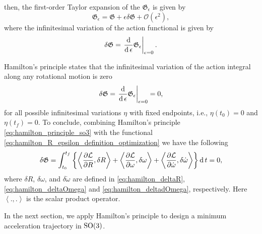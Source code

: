 then, the first-order Taylor expansion of the $\mathfrak{G}_\epsilon$ is given by
\begin{equation}
      \mathfrak{G}_\epsilon = \mathfrak{G} + \epsilon \delta \mathfrak{G} + \mathcal{O}\left(\epsilon^2\right),
\end{equation}
where the infinitesimal variation of the action functional is given by 
\begin{equation}
    \delta \mathfrak{G}  = \left.\frac{\operatorname{d}}{\operatorname{d} \epsilon} \mathfrak{G}_\epsilon\right|_{\epsilon = 0}.
\end{equation}
\par
Hamilton's principle states that the infinitesimal variation of the action integral along any rotational motion is zero
\begin{equation}
    \label{eq:hamilton_principle_so3}
    \delta \mathfrak{G}  = \left.\frac{\operatorname{d}}{\operatorname{d} \epsilon} \mathfrak{G}_\epsilon\right|_{\epsilon = 0} = 0,
\end{equation}
for all possible infinitesimal variations $\eta$ with fixed endpoints, i.e., $\eta(t_0) = 0$ and $\eta(t_f) = 0$.
To conclude, combining Hamilton's principle \eqref{eq:hamilton_principle_so3} with the functional \eqref{eq:hamilton_R_epsilon_definition_optimization} we have the following 
\begin{equation}
    \label{eq:hamilton_principle_so3_explicit}
    \delta\mathfrak{G} = \int_{t_0}^{t_f} \left\{ \left\langle \frac{\partial \mathcal{L}} {\partial R}, \delta R \right\rangle 
    +  \left\langle \frac{\partial \mathcal{L}} {\partial \omega}, \delta \omega \right\rangle
    +  \left\langle \frac{\partial \mathcal{L}} {\partial \dot{\omega}}, \delta \dot{\omega} \right\rangle\right\} \operatorname{d} t = 0,
\end{equation}
where $\delta R$, $\delta \omega$, and $\delta \dot{\omega}$ are defined in \eqref{eq:hamilton_deltaR}, \eqref{eq:hamilton_deltaOmega} and \eqref{eq:hamilton_deltadOmega}, respectively. Here $\left\langle ., . \right\rangle$ is the scalar product operator.
\par
In the next section, we apply Hamilton's principle to design a minimum acceleration trajectory in $\mathrm{SO}(3)$.





